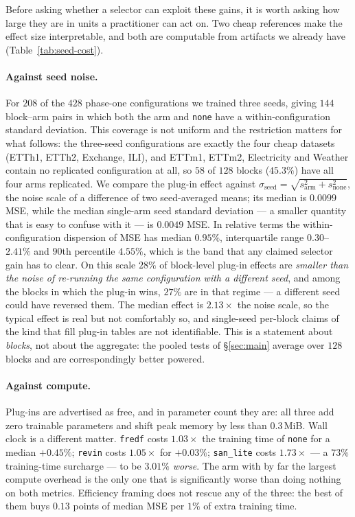 \documentclass[a4paper,fleqn]{cas-sc}
\newcommand{\arm}[1]{\texttt{#1}}
\begin{document}
Before asking whether a selector can exploit these gains, it is worth asking how
large they are in units a practitioner can act on. Two cheap references
make the effect size interpretable, and both are computable from artifacts we
already have (Table~\ref{tab:seed-cost}).

\paragraph{Against seed noise.}
For $208$ of the $428$ phase-one configurations we trained three seeds, giving
$144$ block--arm pairs in
which both the arm and \arm{none} have a within-configuration standard
deviation. This coverage is not uniform and the restriction matters for what
follows: the three-seed configurations are exactly the four cheap datasets
(ETTh1, ETTh2, Exchange, ILI), and ETTm1, ETTm2, Electricity and Weather contain
no replicated configuration at all, so $58$ of $128$ blocks ($45.3\%$) have all
four arms replicated. We compare the plug-in effect against
$\sigma_\text{seed}=\sqrt{s^2_\text{arm}+s^2_\text{none}}$, the noise scale of a
difference of two seed-averaged means; its median is $0.0099$ MSE, while the
median single-arm seed standard deviation --- a smaller quantity that is easy to
confuse with it --- is $0.0049$ MSE. In relative terms the within-configuration
dispersion of MSE has median $0.95\%$, interquartile range $0.30$--$2.41\%$ and
$90$th percentile $4.55\%$, which is the band that any claimed selector gain has
to clear. On this scale $28\%$ of block-level plug-in effects are
\emph{smaller than the noise of re-running the same configuration with a
different seed}, and among the blocks in which the plug-in wins, $27\%$ are in
that regime --- a different seed could have reversed them. The median effect is
$2.13\times$ the noise scale, so the typical effect is real but not comfortably
so, and single-seed per-block claims of the kind that fill plug-in tables are
not identifiable. This is a statement about \emph{blocks}, not about the
aggregate: the pooled tests of \S\ref{sec:main} average over $128$ blocks and
are correspondingly better powered.

\paragraph{Against compute.}
Plug-ins are advertised as free, and in parameter count they are: all three add
zero trainable parameters and shift peak memory by less than $0.3$\,MiB. Wall
clock is a different matter. \arm{fredf} costs $1.03\times$ the training time of
\arm{none} for a median $+0.45\%$; \arm{revin} costs $1.05\times$ for
$+0.03\%$; \arm{san\_lite} costs $1.73\times$ --- a $73\%$ training-time
surcharge --- to be $3.01\%$ \emph{worse}. The arm with by far the largest
compute overhead is the only one that is significantly worse than doing nothing
on both metrics. Efficiency framing does not rescue any of the three: the best
of them buys $0.13$ points of median MSE per $1\%$ of extra training time.
\end{document}
